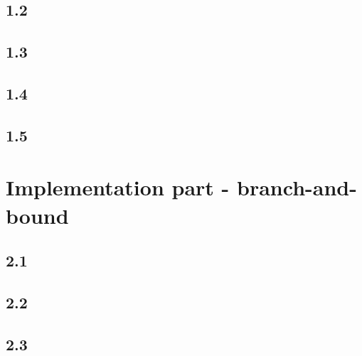 \documentclass[12pt]{article}
\begin{document}
\subsection*{1.2}
\subsection*{1.3}
\subsection*{1.4}
\subsection*{1.5}

\section*{Implementation part - branch-and-bound}
\subsection*{2.1}
\subsection*{2.2}
\subsection*{2.3}
\end{document}
